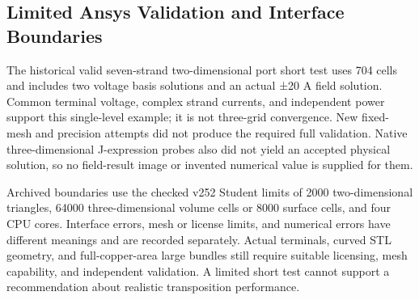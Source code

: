 \documentclass[journal,10pt]{IEEEtran}
\begin{document}
\subsection*{Limited Ansys Validation and Interface Boundaries}
\hypertarget{S2.ansys.heading}{}
The historical valid seven-strand two-dimensional port short test uses 704 cells and includes two voltage basis solutions and an actual ±20 A field solution. Common terminal voltage, complex strand currents, and independent power support this single-level example; it is not three-grid convergence. New fixed-mesh and precision attempts did not produce the required full validation. Native three-dimensional J-expression probes also did not yield an accepted physical solution, so no field-result image or invented numerical value is supplied for them.


Archived boundaries use the checked v252 Student limits of 2000 two-dimensional triangles, 64000 three-dimensional volume cells or 8000 surface cells, and four CPU cores. Interface errors, mesh or license limits, and numerical errors have different meanings and are recorded separately. Actual terminals, curved STL geometry, and full-copper-area large bundles still require suitable licensing, mesh capability, and independent validation. A limited short test cannot support a recommendation about realistic transposition performance.
\end{document}
